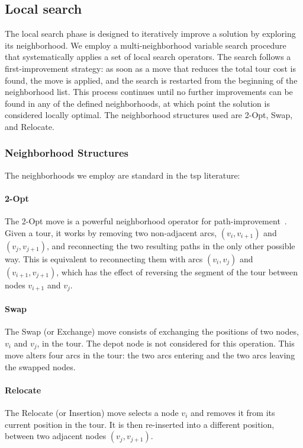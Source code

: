 \documentclass[twocolumn, switch]{article} %
\begin{document}
\subsection{Local search}
The local search phase is designed to iteratively improve a solution by exploring its neighborhood. We employ a multi-neighborhood variable search procedure that systematically applies a set of local search operators. The search follows a first-improvement strategy: as soon as a move that reduces the total tour cost is found, the move is applied, and the search is restarted from the beginning of the neighborhood list. This process continues until no further improvements can be found in any of the defined neighborhoods, at which point the solution is considered locally optimal. The neighborhood structures used are 2-Opt, Swap, and Relocate.

\subsubsection{Neighborhood Structures}
The neighborhoods we employ are standard in the \gls{tsp} literature:

\paragraph{2-Opt} The 2-Opt move is a powerful neighborhood operator for path-improvement~\cite{Croes1958}. Given a tour, it works by removing two non-adjacent arcs, $(v_i, v_{i+1})$ and $(v_j, v_{j+1})$, and reconnecting the two resulting paths in the only other possible way. This is equivalent to reconnecting them with arcs $(v_i, v_j)$ and $(v_{i+1}, v_{j+1})$, which has the effect of reversing the segment of the tour between nodes $v_{i+1}$ and $v_j$.

\paragraph{Swap} The Swap (or Exchange) move consists of exchanging the positions of two nodes, $v_i$ and $v_j$, in the tour. The depot node is not considered for this operation. This move alters four arcs in the tour: the two arcs entering and the two arcs leaving the swapped nodes.

\paragraph{Relocate} The Relocate (or Insertion) move selects a node $v_i$ and removes it from its current position in the tour. It is then re-inserted into a different position, between two adjacent nodes $(v_j, v_{j+1})$.
\end{document}
